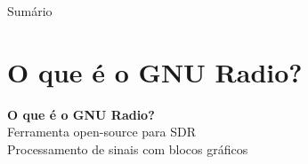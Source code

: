 \documentclass[aspectratio=169]{beamer}
\title{\tituloApresentacao}
\subtitle{\subtituloApresentacao}
\author{\autorNome}
\institute{\institutoFinal}
\date{\dataApresentacao}
\begin{document}
\begin{frame}
\titlepage
\end{frame}

\begin{frame}{Sum\'{a}rio}
\small
\tableofcontents[hideallsubsections]
\end{frame}

\section{O que \'{e} o GNU Radio?}

{
\begin{frame}[plain,c]
\begin{center}
{\Huge\textbf{O que \'{e} o GNU Radio?}}\\[0.8cm]
{\LARGE Ferramenta open-source para SDR}\\[0.5cm]
{\large Processamento de sinais com blocos gr\'{a}ficos}
\end{center}
\end{frame}
}
\end{document}
